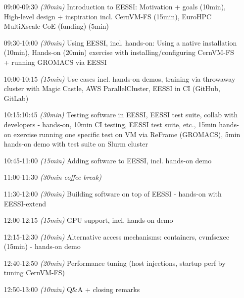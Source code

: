 \begin{itemize}[style=standard, labelwidth=1.9cm]


    \item [09:00-09:30] \emph{(30min)} Introduction to EESSI: Motivation + goals (10min), High-level design + inspiration incl. CernVM-FS (15min), EuroHPC MultiXscale CoE (funding) (5min)
    \item [09:30-10:00] \emph{(30min)} Using EESSI, incl. hands-on: Using a native installation (10min), Hands-on (20min) exercise with installing/configuring CernVM-FS + running GROMACS via EESSI
    \item [10:00-10:15] \emph{(15min)} Use cases incl. hands-on demos, training via throwaway cluster with Magic Castle, AWS ParallelCluster, EESSI in CI (GitHub, GitLab)
    \item [10:15:10:45] \emph{(30min)} Testing software in EESSI, EESSI test suite, collab with developers - hands-on, 10min CI testing, EESSI test suite, etc., 15min hands-on exercise running one specific test on VM via ReFrame (GROMACS), 5min hands-on demo with test suite on Slurm cluster
    \item [10:45-11:00] \emph{(15min)} Adding software to EESSI, incl. hands-on demo
    \item [11:00-11:30] \emph{(30min coffee break)}
    \item [11:30-12:00] \emph{(30min)} Building software on top of EESSI - hands-on with EESSI-extend
    \item [12:00-12:15] \emph{(15min)} GPU support, incl. hands-on demo
    \item [12:15-12:30] \emph{(10min)} Alternative access mechanisms: containers, cvmfsexec (15min) - hands-on demo
    \item [12:40-12:50] \emph{(20min)} Performance tuning (host injections, startup perf by tuning CernVM-FS)
    \item [12:50-13:00] \emph{(10min)} Q\&A + closing remarks

\end{itemize}

